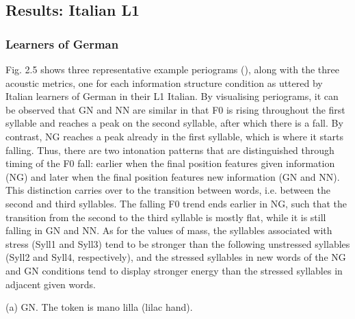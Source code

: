 \subsection{Results: Italian L1} 
\hypertarget{Toc191305896}{}\subsubsection{Learners of German}
\hypertarget{Toc191305897}{}
Fig. 2.5 shows three representative example periograms (), along with the three acoustic metrics, one for each information structure condition as uttered by Italian learners of German in their L1 Italian. By visualising periograms, it can be observed that GN and NN are similar in that F0 is rising throughout the first syllable and reaches a peak on the second syllable, after which there is a fall. By contrast, NG reaches a peak already in the first syllable, which is where it starts falling. Thus, there are two intonation patterns that are distinguished through timing of the F0 fall: earlier when the final position features given information (NG) and later when the final position features new information (GN and NN). This distinction carries over to the transition between words, i.e. between the second and third syllables. The falling F0 trend ends earlier in NG, such that the transition from the second to the third syllable is mostly flat, while it is still falling in GN and NN. As for the values of mass, the syllables associated with stress (Syll1 and Syll3) tend to be stronger than the following unstressed syllables (Syll2 and Syll4, respectively), and the stressed syllables in new words of the NG and GN conditions tend to display stronger energy than the stressed syllables in adjacent given words.

\begin{stylecaption}
  
 
\end{stylecaption}

\begin{stylecaption}
(a) GN. The token is mano lilla (lilac hand).
\end{stylecaption}

\begin{stylecaption}
  
 
\end{stylecaption}

